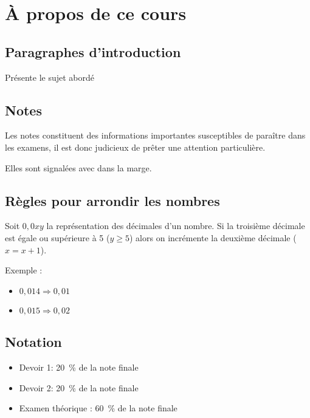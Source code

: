 \chapter*{À propos de ce cours}



\section*{Paragraphes d'introduction}
\begin{intro}
	Présente le sujet abordé 
\end{intro}



\section*{Notes}
\begin{note}
	Les notes constituent des informations importantes susceptibles de paraître dans les examens, il est donc judicieux de prêter une attention particulière. 
\end{note}
Elles sont signalées avec \righthand{} dans la marge.






\section*{Règles pour arrondir les nombres}
Soit $0,0xy$ la représentation des décimales d'un nombre. Si la troisième décimale est égale ou supérieure à 5 ($y \geq 5$) alors on incrémente la deuxième décimale ($x = x + 1$).

Exemple :
\begin{itemize}
	\item $0,014 \Rightarrow 0,01$
	\item $0,015 \Rightarrow 0,02$
\end{itemize}



\section*{Notation}
\begin{itemize}
	\item Devoir 1: 20~\% de la note finale
	\item Devoir 2: 20~\% de la note finale
	\item Examen théorique : 60~\% de la note finale
\end{itemize}